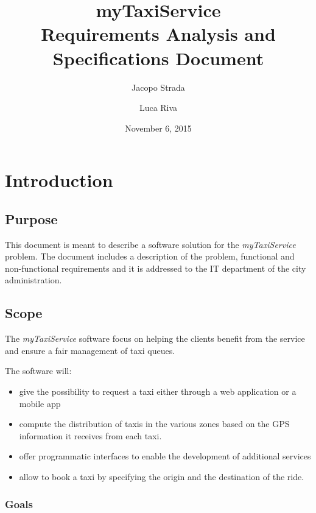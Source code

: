 \documentclass[a4paper]{article}
\title{{\Huge myTaxiService} \\ Requirements Analysis and Specifications Document}
\author{Jacopo Strada \and Luca Riva}
\date{November 6, 2015}
\let\stdsection\section
\renewcommand\section{\newpage\stdsection}
\begin{document}
\maketitle

\newpage

\tableofcontents

\listoffigures 

\listoftables

\setlength{\parindent}{0em}
\setlength{\parskip}{1em}

\section{Introduction}
\subsection{Purpose}
This document is meant to describe a software solution for the \emph{myTaxiService} problem. The document includes a description of the problem, functional and non-functional requirements and it is addressed to the IT department of the city administration.

\subsection{Scope}
The \emph{myTaxiService} software focus on helping the clients benefit from the service and ensure a fair management of taxi queues.

The software will:

\begin{itemize}
\item give the possibility to request a taxi either through a web application or a mobile app
\item compute the distribution of taxis in the various zones based on the GPS information it receives from each taxi.
\item offer programmatic interfaces to enable the development of additional services
\item allow to book a taxi by specifying the origin and the destination of the ride.
\end{itemize}

\subsubsection{Goals}
\end{document}
